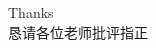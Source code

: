 \begin{frame}[allowframebreaks]
    \nocite{*} %
    
    
\end{frame}

\begin{frame}
    \begin{center}
        {\Huge\calligra Thanks}
        \\[6ex]
        {\Huge\wuyushengxingkai 恳请各位老师批评指正}
    \end{center}
\end{frame}